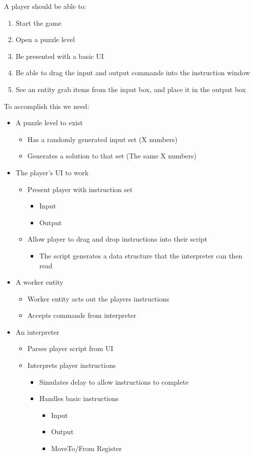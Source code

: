 A player should be able to:
\begin{enumerate}
  \item Start the game
  \item Open a puzzle level
  \item Be presented with a basic UI
  \item Be able to drag the input and output commands into the instruction
  window
  \item See an entity grab items from the input box, and place it in the output
  box
\end{enumerate}

To accomplish this we need:
\begin{itemize}
  \item A puzzle level to exist
  \begin{itemize}
    \item Has a randomly generated input set (X numbers)
    \item Generates a solution to that set (The same X numbers)
  \end{itemize}
  \item The player’s UI to work
  \begin{itemize}
    \item Present player with instruction set
    \begin{itemize}
      \item Input
      \item Output
    \end{itemize}
    \item Allow player to drag and drop instructions into their script
    \begin{itemize}
      \item The script generates a data structure that the interpreter can then read
    \end{itemize}
  \end{itemize}
  \item A worker entity
  \begin{itemize}
    \item Worker entity acts out the players instructions
    \item Accepts commands from interpreter
  \end{itemize}
  \item An interpreter
  \begin{itemize}
    \item Parses player script from UI
    \item Interprets player instructions
    \begin{itemize}
      \item Simulates delay to allow instructions to complete
      \item Handles basic instructions
      \begin{itemize}
        \item Input
        \item Output
        \item MoveTo/From Register
      \end{itemize}
    \end{itemize}
  \end{itemize}
\end{itemize}

